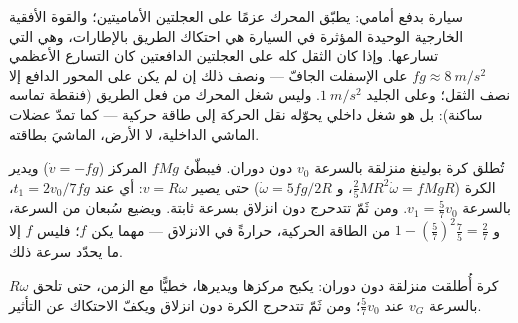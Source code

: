 \begin{example}\label{ex:b2:rigid-body-mechanics:car}
سيارة بدفع أمامي: يطبّق المحرك عزمًا على العجلتين الأماميتين؛
والقوة الأفقية الخارجية الوحيدة المؤثرة في السيارة هي احتكاك
الطريق بالإطارات، وهي التي تسارعها. وإذا كان الثقل كله
على العجلتين الدافعتين كان التسارع الأعظمي
$fg \approx \qty{8}{m/s^2}$ على الإسفلت الجافّ --- ونصف ذلك إن لم يكن
على المحور الدافع إلا نصف الثقل؛ وعلى الجليد $\qty{1}{m/s^2}$.
وليس شغل المحرك من فعل الطريق (فنقطة تماسه ساكنة): بل هو شغل
داخلي يحوّله نقل الحركة إلى طاقة حركية --- كما تمدّ عضلات
الماشي الداخلية، لا الأرض، الماشيَ بطاقته.
\end{example}

\begin{example}\label{ex:b2:rigid-body-mechanics:bowling}
تُطلق كرة بولينغ منزلقة بالسرعة $v_0$ دون دوران. فيبطّئ  $fMg$ المركز ($\dot v = -fg$) ويدير الكرة
($\tfrac25MR^2\dot\omega = fMgR$، و $\dot\omega = 5fg/2R$) حتى يصير $v = R\omega$:
أي عند $t_1 = 2v_0/7fg$، بالسرعة $v_1 = \tfrac57v_0$. ومن ثَمّ تتدحرج
دون انزلاق بسرعة ثابتة. ويضيع سُبعان من السرعة، و
$1 - (\tfrac57)^2\tfrac75 = \tfrac27$ من الطاقة الحركية، حرارةً في
الانزلاق --- مهما يكن $f$؛ فليس $f$ إلا ما يحدّد سرعة ذلك.
\end{example}

\begin{omfigure}

{\small كرة أُطلقت منزلقة دون دوران: يكبح  مركزها
ويديرها، خطيًّا مع الزمن، حتى تلحق $R\omega$ بالسرعة
$v_G$ عند $\tfrac57v_0$؛ ومن ثَمّ تتدحرج الكرة دون انزلاق ويكفّ
الاحتكاك عن التأثير.}
\end{omfigure}

